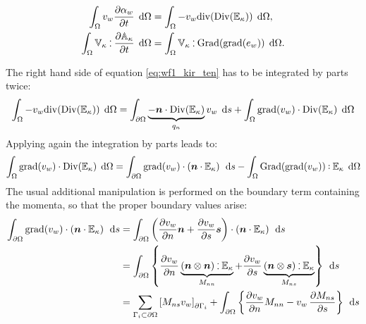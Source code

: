 \documentclass[11pt]{article}
\def\onedot{$\mathsurround0pt\ldotp$}
\def\cddot{%
	\mathbin{\vcenter{\baselineskip.67ex
			\hbox{\onedot}\hbox{\onedot}}%
}}
\begin{document}
	\begin{align}
	\int_{\Omega} v_w \diffp{\alpha_w}{t} \,  \d\Omega &=  \int_{\Omega} -v_w \mathrm{div}(\mathrm{Div}(\mathbb{E}_{\kappa})) \, \d\Omega,  \label{eq:wf1_kir_ten}\\
	\int_{\Omega} \mathbb{V}_{\kappa} \cddot \diffp{\mathbb{A}_{\kappa}}{t} \,  \d\Omega &= \int_{\Omega} \mathbb{V}_{\kappa} \cddot  \mathrm{Grad}(\mathrm{grad}(e_w)) \,   \d\Omega.  \label{eq:wf2_kir_ten}
	\end{align}
	
	The right hand side of equation \eqref{eq:wf1_kir_ten} has to be integrated by parts twice:
	\begin{equation}
	\label{eq:line1_wf1_ten}
	\int_{\Omega} - v_w \mathrm{div}(\mathrm{Div}(\mathbb{E}_{\kappa})) \, \d\Omega = \int_{\partial \Omega} \underbrace{- \bm{n} \cdot \mathrm{Div}(\mathbb{E}_{\kappa})}_{q_n} v_w \, \d{s} + \int_{\Omega} \mathrm{grad}(v_w)  \cdot \mathrm{Div}(\mathbb{E}_{\kappa}) \, \d\Omega
	\end{equation}
	Applying again the integration by parts leads to:
	\begin{equation}
	\label{eq:line1_wf2_ten}
	\int_{\Omega} \mathrm{grad}(v_w)  \cdot \mathrm{Div}(\mathbb{E}_{\kappa}) \, \d\Omega = \int_{\partial \Omega} \mathrm{grad}(v_w)  \cdot \left( \bm{n} \cdot \mathbb{E}_{\kappa} \right) \, \d{s} -  \int_{\Omega}\mathrm{Grad}(\mathrm{grad}(v_w))  \cddot \mathbb{E}_{\kappa} \, \d\Omega
	\end{equation}
	The usual additional manipulation is performed on the boundary term containing the momenta, so that the proper boundary values arise:
	\begin{equation}
	\label{eq:line1_ipbc_ten}
	\begin{aligned}
	\int_{\partial \Omega} \mathrm{grad}(v_w)  \cdot \left( \bm{n} \cdot \mathbb{E}_{\kappa} \right) \, \d{s} &= \int_{\partial \Omega} \left(\diffp{v_w}{n} \bm{n} + \diffp{v_w}{s} \bm{s} \right)  \cdot \left( \bm{n} \cdot \mathbb{E}_{\kappa} \right) \, \d{s} \\
	&= \int_{\partial \Omega} \left\{  \diffp{v_w}{n}  \underbrace{\left(\bm{n} \otimes \bm{n} \right) \cddot \mathbb{E}_{\kappa} }_{M_{nn}} +  \diffp{v_w}{s}  \underbrace{\left(\bm{n} \otimes \bm{s} \right) \cddot \mathbb{E}_{\kappa}}_{M_{ns}} \right\}  \, \d{s} \\
	&= \sum_{\Gamma_{i} \subset \partial \Omega} \left[ M_{ns} v_w \right]_{\partial \Gamma_i} + \int_{\partial \Omega} \left\{ \diffp{v_w}{n} M_{nn}  - v_w \, \diffp{M_{ns}}{s} \right\} \, \d{s}
	\end{aligned}
	\end{equation}
\end{document}
